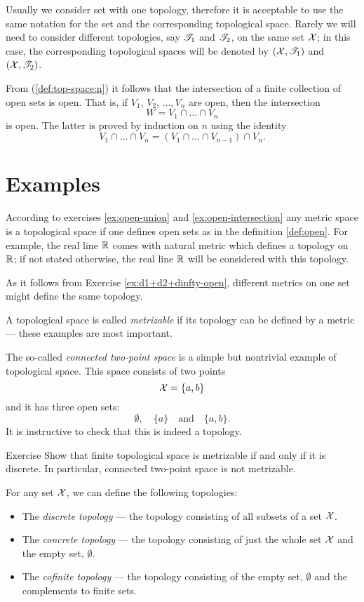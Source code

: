 Usually we consider set with one topology, therefore it is acceptable to use the same notation for the set and the corresponding topological space.
Rarely we will need to consider different topologies, say $\mathscr{T}_1$ and $\mathscr{T}_2$, on the same set $\mathcal{X}$;
in this case, the corresponding topological spaces will be denoted by $(\mathcal{X},\mathscr{T}_1)$ and $(\mathcal{X},\mathscr{T}_2)$.


From (\ref{def:top-space:n}) it follows that the intersection of a finite collection of open sets is open.
That is, if $V_1$, $V_2$, $\dots, V_n$ are open, then the intersection 
\[W=V_1 \cap \dots\cap V_n\] is open.
The latter is proved by induction on $n$ using the identity
\[V_1 \cap \dots\cap V_n=(V_1 \cap \dots \cap V_{n-1})\cap V_n.\]

\section{Examples}\label{sec:ecamples(top)}

According to exercises \ref{ex:open-union} and \ref{ex:open-intersection} any metric space is a topological space if one defines open sets as in the definition \ref{def:open}.
For example, the real line $\mathbb{R}$ comes with natural metric which defines a topology on $\mathbb{R}$;
if not stated otherwise, the real line $\mathbb{R}$ will be considered with this topology.

As it follows from Exercise \ref{ex:d1+d2+dinfty-open},
different metrics on one set might define the same topology.

A topological space is called \emph{metrizable} if its topology can be defined by a metric --- these examples are most important.

The so-called \emph{connected two-point space} is a simple but nontrivial example of topological space.
This space consists of two points 
\[\mathcal{X}=\{a,b\}\]
and it has three open sets: 
\[\emptyset,\quad \{a\}\quad\text{and}\quad\{a,b\}.\]
It is instructive to check that this is indeed a topology.

\begin{thm}{Exercise}\label{ex:finite+metrizable}
Show that finite topological space is metrizable if and only if it is discrete.
In particular, connected two-point space is not metrizable.
\end{thm}

For any set $\mathcal{X}$, we can define the following topologies:
\begin{itemize} 
\item  The \emph{discrete topology} --- the topology consisting of all subsets of a set $\mathcal{X}$.
\item  The \emph{concrete topology}  --- the topology consisting of just the whole set $\mathcal{X}$ and the empty set, $\emptyset$.
\item  The \emph{cofinite topology} --- the topology consisting of the empty set, $\emptyset$ and the complements to finite sets.
\end{itemize}

